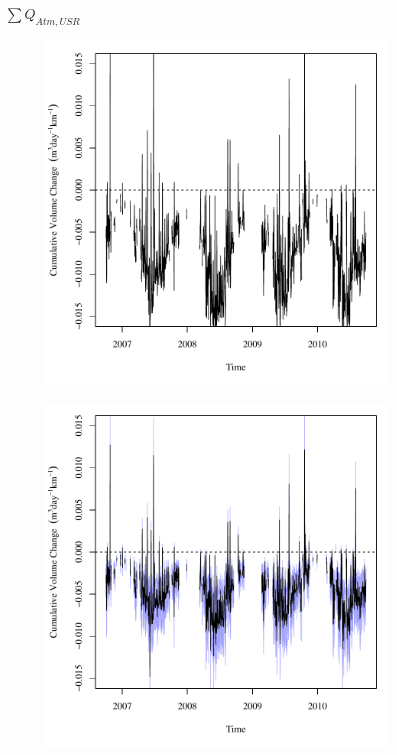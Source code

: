 \begin{linenumbers}
\subfiguretop
\begin{landscape}
	\begin{figure}
		\centering
		$ \displaystyle \sum Q_{Atm,USR} $
		\begin{subfigure}{0.7\textwidth}
			\centering
			\includegraphics[width=\tableCustomSize]{"Figures/Results_USR/Deterministic/Balance Water - atm"}
		\end{subfigure}%
		\begin{subfigure}{0.7\textwidth}
			\centering
			\includegraphics[width=\tableCustomSize]{"Figures/Results_USR/Stochastic/Balance Water - atm"}

\end{subfigure}
\end{figure}
\end{landscape}
\end{linenumbers}
